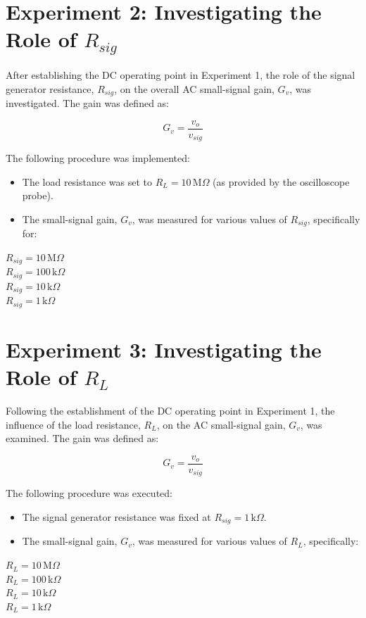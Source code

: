 \newpage
\section{Experiment 2: Investigating the Role of \texorpdfstring{$R_{sig}$}{Rsig}}

After establishing the DC operating point in Experiment 1, the role of the signal generator resistance, \(R_{sig}\), on the overall AC small-signal gain, \(G_v\), was investigated. The gain was defined as:

\[
G_v = \frac{v_o}{v_{sig}}
\]

The following procedure was implemented:

\begin{itemize}
    \item The load resistance was set to \(R_{L} = 10\,\text{M}\Omega\) (as provided by the oscilloscope probe).
    \item The small-signal gain, \(G_v\), was measured for various values of \(R_{sig}\), specifically for:
\end{itemize}
\vspace{0.2cm}
\begin{center}
\(R_{sig} = 10\,\text{M}\Omega\) \\[0.2cm]
\(R_{sig} = 100\,\text{k}\Omega\) \\[0.2cm]
\(R_{sig} = 10\,\text{k}\Omega\) \\[0.2cm]
\(R_{sig} = 1\,\text{k}\Omega\)
\end{center}


\section{Experiment 3: Investigating the Role of \texorpdfstring{$R_{L}$}{RL}}

Following the establishment of the DC operating point in Experiment 1, the influence of the load resistance, \(R_{L}\), on the AC small-signal gain, \(G_v\), was examined. The gain was defined as:

\[
G_v = \frac{v_o}{v_{sig}}
\]

The following procedure was executed:

\begin{itemize}
    \item The signal generator resistance was fixed at \(R_{sig} = 1\,\text{k}\Omega\).
    \item The small-signal gain, \(G_v\), was measured for various values of \(R_{L}\), specifically:
\end{itemize}
\vspace{0.2cm}
\begin{center}
\(R_{L} = 10\,\text{M}\Omega\) \\[0.2cm]
\(R_{L} = 100\,\text{k}\Omega\) \\[0.2cm]
\(R_{L} = 10\,\text{k}\Omega\) \\[0.2cm]
\(R_{L} = 1\,\text{k}\Omega\)
\end{center}

